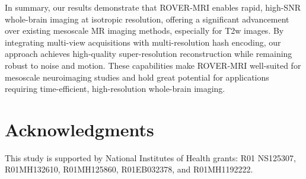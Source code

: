 \documentclass[AMA,STIX2COL]{MRM}
\begin{document}
In summary, our results demonstrate that ROVER-MRI enables rapid, high-SNR whole-brain imaging at isotropic resolution, offering a significant advancement over existing mesoscale MR imaging methods, especially for T2w images. By integrating multi-view acquisitions with multi-resolution hash encoding, our approach achieves high-quality super-resolution reconstruction while remaining robust to noise and motion. These capabilities make ROVER-MRI well-suited for mesoscale neuroimaging studies and hold great potential for applications requiring time-efficient, high-resolution whole-brain imaging.

\section*{Acknowledgments}
This study is supported by National Institutes of Health grants: R01 NS125307, R01MH132610, R01MH125860, R01EB032378, and R01MH1192222.




%
\vfill\pagebreak

\end{document}
